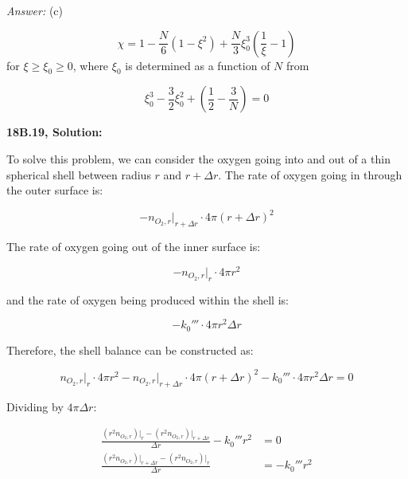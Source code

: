 \documentclass[letterpaper,12pt]{article}
\begin{document}
\textit{Answer:} (c)

\begin{equation}
    \chi = 1 - \frac{N}{6} \left( 1 - \xi^2 \right) + \frac{N}{3} \xi_0^3 \left( \frac{1}{\xi} - 1 \right)
\end{equation}
for $\xi \geq \xi_0 \geq 0$, where $\xi_0$ is determined as a function of $N$ from

\begin{equation}
    \xi_0^3 - \frac{3}{2} \xi_0^2 + \left( \frac{1}{2} - \frac{3}{N} \right) = 0
\end{equation}

\vspace{6pt}

\textbf{18B.19, Solution:}

To solve this problem, we can consider the oxygen going into and out of a thin spherical shell between radius $r$ and $r + \Delta r$. The rate of oxygen going in through the outer surface is:

\begin{equation}
    - n_{O_{2}, r} \bigg|_{r + \Delta r} \cdot 4 \pi (r + \Delta r)^2
\end{equation}

The rate of oxygen going out of the inner surface is:

\begin{equation}
    - n_{O_{2}, r} \bigg|_{r} \cdot 4 \pi r^2
\end{equation}

and the rate of oxygen being produced within the shell is:

\begin{equation}
    -k_0''' \cdot 4 \pi r^2 \Delta r
\end{equation}

Therefore, the shell balance can be constructed as:

\begin{equation}
    n_{O_{2}, r} \bigg|_{r} \cdot 4 \pi r^2 - n_{O_{2}, r} \bigg|_{r + \Delta r} \cdot 4 \pi (r + \Delta r)^2 - k_0''' \cdot 4 \pi r^2 \Delta r = 0
\end{equation}

Dividing by $4 \pi \Delta r$:

\begin{equation}
\begin{aligned}
    \frac{\left( r^2 n_{O_{2}, r} \right) \bigg|_{r} - \left( r^2 n_{O_{2}, r} \right) \bigg|_{r + \Delta r}}{\Delta r} - k_0''' r^2 &= 0 \\[6pt]
    \frac{\left( r^2 n_{O_{2}, r} \right) \bigg|_{r + \Delta r} - \left( r^2 n_{O_{2}, r} \right) \bigg|_{r}}{\Delta r} &= -k_0''' r^2 
\end{aligned}
\end{equation}
\end{document}

